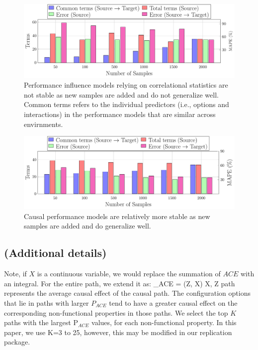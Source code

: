 \begin{figure}[h]
\small
    \centering
    \includegraphics*[width=\linewidth]{figures-vg/reg_eq_noise.pdf}
    \caption{\small {Performance influence models relying on correlational statistics are not stable as new samples are added and do not generalize well. Common terms refers to the individual predictors (i.e., options and interactions) in the performance models that are similar across envirnments.}}
    \label{fig:reg_eq_noise}
    
\end{figure}

\begin{figure}[h]
\small
    \centering
    \includegraphics*[width=\linewidth]{figures-vg/reg_eq_noise_cpm.pdf}
    \caption{\small {Causal performance models are relatively more stable as new samples are added and do generalize well.}}
    \label{fig:reg_eq_noise_cpm}
    
\end{figure}

\subsection{\ourapproach (Additional details)}

Note, if $X$ is a continuous variable, we would replace the summation of $ACE$ with an integral. 
% 
For the entire path, we extend it as:
\smalleq
\label{eq:path_ace}
{\footnotesize
\setlength{\abovedisplayskip}{1pt}
\setlength{\belowdisplayskip}{1pt}
_{ACE} =  \cdot \sum {}(Z, X) \hspace{2em} \footnotesize \forall X, Z \in path 
}
\eeq
{} represents the average causal effect of the causal path. The configuration options that lie in paths with larger $P_{ACE}$ tend to have a greater causal effect on the corresponding non-functional properties in those paths. We select the top $K$ paths with the largest $\mathrm{P}_{ACE}$ values, for each non-functional property. In this paper, we use K=3 to 25, however, this may be modified in our replication package. 

